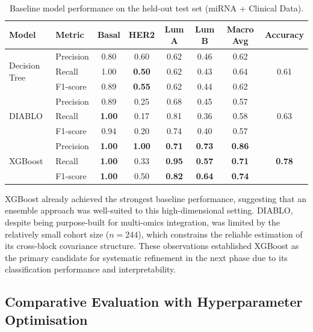 \begin{table}[!ht]
    \centering
    \caption{Baseline model performance on the held-out test set (miRNA + Clinical Data).}
    \label{tab:baseline-results}
    \small
    \begin{tabular}{llcccccc}
    \toprule
    \textbf{Model} & \textbf{Metric} & \textbf{Basal} & \textbf{HER2} & \textbf{Lum A} & \textbf{Lum B} & \textbf{Macro Avg} & \textbf{Accuracy} \\
    \midrule
    \multirow{3}{*}{Decision Tree}
    & Precision & 0.80 & 0.60 & 0.62 & 0.46 & 0.62 & \multirow{3}{*}{0.61} \\
    & Recall    & 1.00 & \textbf{0.50} & 0.62 & 0.43 & 0.64 & \\
    & F1-score  & 0.89 & \textbf{0.55} & 0.62 & 0.44 & 0.62 & \\
    \midrule
    \multirow{3}{*}{DIABLO}
    & Precision & 0.89 & 0.25 & 0.68 & 0.45 & 0.57 & \multirow{3}{*}{0.63} \\
    & Recall    & \textbf{1.00} & 0.17 & 0.81 & 0.36 & 0.58 & \\
    & F1-score  & 0.94 & 0.20 & 0.74 & 0.40 & 0.57 & \\
    \midrule
    \multirow{3}{*}{XGBoost}
    & Precision & \textbf{1.00} & \textbf{1.00} & \textbf{0.71} & \textbf{0.73} & \textbf{0.86} & \multirow{3}{*}{\textbf{0.78}} \\
    & Recall    & \textbf{1.00} & 0.33 & \textbf{0.95} & \textbf{0.57} & \textbf{0.71} & \\
    & F1-score  & \textbf{1.00} & 0.50 & \textbf{0.82} & \textbf{0.64} & \textbf{0.74} & \\
    \bottomrule
    \end{tabular}
\end{table}

XGBoost already achieved the strongest baseline performance, 
suggesting that an ensemble approach was well-suited to this 
high-dimensional setting. DIABLO, despite being purpose-built 
for multi-omics integration, was limited by the relatively small 
cohort size ($n = 244$), which constrains the reliable estimation 
of its cross-block covariance structure. These observations 
established XGBoost as the primary candidate for systematic 
refinement in the next phase due to its classification 
performance and interpretability.

\subsection{Comparative Evaluation with Hyperparameter Optimisation}
\label{sec:xgboost-final}

